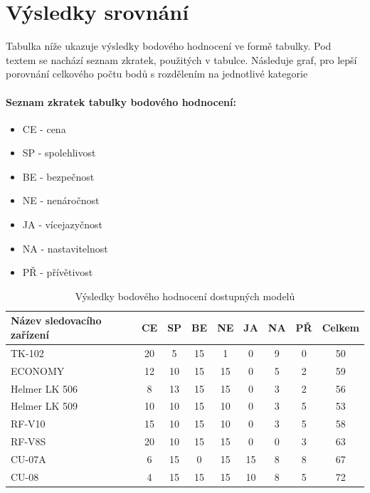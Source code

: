 \documentclass[FM,BP]{tulthesis}  %
\begin{document}

\section{Výsledky srovnání}
Tabulka níže ukazuje výsledky bodového hodnocení ve formě tabulky. Pod textem se nachází seznam zkratek, použitých v tabulce. Následuje graf, pro lepší  porovnání celkového počtu bodů s rozdělením na jednotlivé kategorie

\paragraph{Seznam zkratek tabulky bodového hodnocení:}
\begin{itemize}
\item CE - cena
\item SP - spolehlivost
\item BE - bezpečnost
\item NE - nenáročnost
\item JA - vícejazyčnost
\item NA - nastavitelnost
\item PŘ - přívětivost
\end{itemize}

\renewcommand{\arraystretch}{1.5}
\begin{table}[H]
\begin{center}
\begin{tabular}{| l | c | c| c | c | c | c | c | c |}
\hline
Název sledovacího zařízení & CE & SP & BE & NE & JA & NA & PŘ & Celkem\\
\hline
\hline
TK-102 & 20 & 5 & 15 & 1 & 0 & 9 & 0 & 50\\
\hline
ECONOMY & 12 & 10 & 15 & 15 & 0 & 5 & 2 & 59\\
\hline
Helmer LK 506 & 8 & 13 & 15 & 15 & 0 & 3 & 2 & 56\\
\hline
Helmer LK 509 & 10 & 10 & 15 & 10 & 0 & 3 & 5 & 53\\
\hline
RF-V10 & 15 & 10 & 15 & 10 & 0 & 3 & 5 & 58\\
\hline
RF-V8S & 20 & 10 & 15 & 15 & 0 & 0 & 3 & 63\\
\hline
CU-07A & 6 & 15 & 0 & 15 & 15 & 8 & 8 & 67\\
\hline
CU-08 & 4 & 15 & 15 & 15 & 10 & 8 & 5 & 72\\
\hline
\end{tabular}
\end{center}
\caption{Výsledky bodového hodnocení dostupných modelů}
\end{table}
\end{document}
